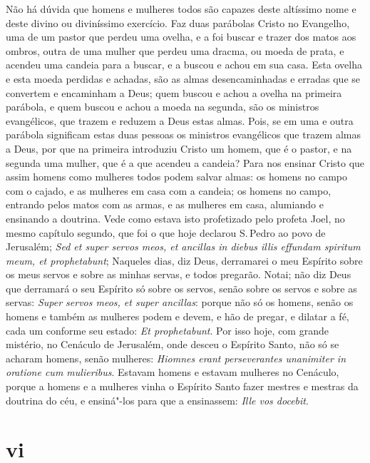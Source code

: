 Não há dúvida que homens e mulheres todos são capazes deste altíssimo
nome e deste divino ou diviníssimo exercício. Faz duas parábolas Cristo
no Evangelho, uma de um pastor que perdeu uma ovelha, e a foi buscar e
trazer dos matos aos ombros, outra de uma mulher que perdeu uma dracma,
ou moeda de prata, e acendeu uma candeia para a buscar, e a buscou e
achou em sua casa. Esta ovelha e esta moeda perdidas e achadas, são as
almas desencaminhadas e erradas que se convertem e encaminham a Deus;
quem buscou e achou a ovelha na primeira parábola, e quem buscou e achou
a moeda na segunda, são os ministros evangélicos, que trazem e reduzem a
Deus estas almas. Pois, se em uma e outra parábola significam estas duas
pessoas os ministros evangélicos que trazem almas a Deus, por que na
primeira introduziu Cristo um homem, que é o pastor, e na segunda uma
mulher, que é a que acendeu a candeia? Para nos ensinar Cristo que assim
homens como mulheres todos podem salvar almas: os homens no campo com o
cajado, e as mulheres em casa com a candeia; os homens no campo,
entrando pelos matos com as armas, e as mulheres em casa, alumiando e
ensinando a doutrina.
Vede como estava isto profetizado pelo profeta Joel, no mesmo capítulo
segundo, que foi o que hoje declarou S.\,Pedro ao povo de Jerusalém;
\emph{Sed et super servos meos, et ancillas in diebus illis effundam
spiritum meum, et prophetabunt}; Naqueles dias, diz Deus,
derramarei o meu Espírito sobre os meus servos e sobre as minhas
servas, e todos pregarão. Notai; não diz Deus que derramará o seu
Espírito só sobre os servos, senão sobre os servos e sobre as servas:
\emph{Super servos meos, et super ancillas}: porque não só os homens,
senão os homens e também as mulheres podem e devem, e hão de pregar, e
dilatar a fé, cada um conforme seu estado: \emph{Et prophetabunt}. Por
isso hoje, com grande mistério, no Cenáculo de Jerusalém, onde desceu o
Espírito Santo, não só se acharam homens, senão mulheres: \emph{Hiomnes
erant perseverantes unanimiter in oratione cum mulieribus}. Estavam
homens e estavam mulheres no Cenáculo, porque a homens e a mulheres
vinha o Espírito Santo fazer mestres e mestras da doutrina do céu, e
ensiná"-los para que a ensinassem: \emph{Ille vos docebit}.

\section{vi}

